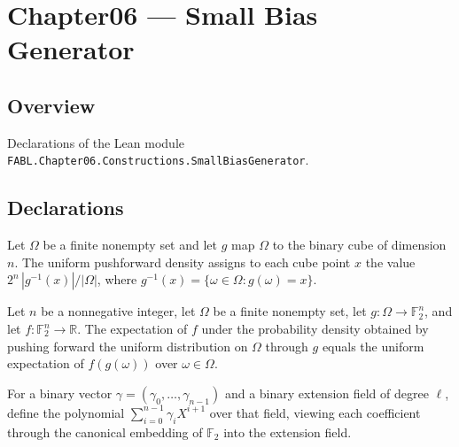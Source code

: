 \chapter{Chapter06 — Small Bias Generator}
\section{Overview}

Declarations of the Lean module \texttt{FABL.Chapter06.Constructions.SmallBiasGenerator}.

\section{Declarations}

\begin{definition}
\label{FABL.ProbabilityDensity.uniformPushforward}
\leanok
{}
Let $\Omega$ be a finite nonempty set and let $g$ map $\Omega$ to the binary cube of
dimension $n$. The uniform pushforward density assigns to each cube point $x$ the value
$2^n\,|g^{-1}(x)|/|\Omega|$, where $g^{-1}(x)=\{\omega\in\Omega:g(\omega)=x\}$.
\end{definition}

\begin{theorem}
\label{FABL.ProbabilityDensity.expectation_uniformPushforward}
\leanok
{}
Let $n$ be a nonnegative integer, let $\Omega$ be a finite nonempty set, let
$g:\Omega\to\mathbb F_2^n$, and let $f:\mathbb F_2^n\to\mathbb R$. The expectation of
$f$ under the probability density obtained by pushing forward the uniform distribution
on $\Omega$ through $g$ equals the uniform expectation of $f(g(\omega))$ over
$\omega\in\Omega$.
\end{theorem}

\begin{definition}
\label{FABL.smallBiasPolynomial}
\leanok
{}
For a binary vector $\gamma=(\gamma_0,\ldots,\gamma_{n-1})$ and a binary extension field
of degree $\ell$, define the polynomial $\sum_{i=0}^{n-1}\gamma_i X^{i+1}$ over that
field, viewing each coefficient through the canonical embedding of $\mathbb{F}_2$ into
the extension field.
\end{definition}

